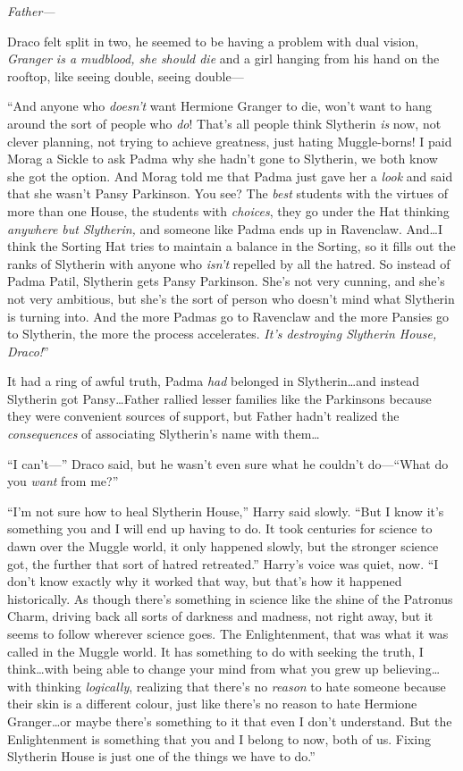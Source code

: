 \emph{Father—}

Draco felt split in two, he seemed to be having a problem with dual vision, \emph{Granger is a mudblood, she should die} and a girl hanging from his hand on the rooftop, like seeing double, seeing double—

“And anyone who \emph{doesn’t} want Hermione Granger to die, won’t want to hang around the sort of people who \emph{do}! That’s all people think Slytherin \emph{is} now, not clever planning, not trying to achieve greatness, just hating Muggle-borns! I paid Morag a Sickle to ask Padma why she hadn’t gone to Slytherin, we both know she got the option. And Morag told me that Padma just gave her a \emph{look} and said that she wasn’t Pansy Parkinson. You see? The \emph{best} students with the virtues of more than one House, the students with \emph{choices}, they go under the Hat thinking \emph{anywhere but Slytherin,} and someone like Padma ends up in Ravenclaw. And…I think the Sorting Hat tries to maintain a balance in the Sorting, so it fills out the ranks of Slytherin with anyone who \emph{isn’t} repelled by all the hatred. So instead of Padma Patil, Slytherin gets Pansy Parkinson. She’s not very cunning, and she’s not very ambitious, but she’s the sort of person who doesn’t mind what Slytherin is turning into. And the more Padmas go to Ravenclaw and the more Pansies go to Slytherin, the more the process accelerates. \emph{It’s destroying Slytherin House, Draco!}”

It had a ring of awful truth, Padma \emph{had} belonged in Slytherin…and instead Slytherin got Pansy…Father rallied lesser families like the Parkinsons because they were convenient sources of support, but Father hadn’t realized the \emph{consequences} of associating Slytherin’s name with them…

“I can’t—” Draco said, but he wasn’t even sure what he couldn’t do—“What do you \emph{want} from me?”

“I’m not sure how to heal Slytherin House,” Harry said slowly. “But I know it’s something you and I will end up having to do. It took centuries for science to dawn over the Muggle world, it only happened slowly, but the stronger science got, the further that sort of hatred retreated.” Harry’s voice was quiet, now. “I don’t know exactly why it worked that way, but that’s how it happened historically. As though there’s something in science like the shine of the Patronus Charm, driving back all sorts of darkness and madness, not right away, but it seems to follow wherever science goes. The Enlightenment, that was what it was called in the Muggle world. It has something to do with seeking the truth, I think…with being able to change your mind from what you grew up believing…with thinking \emph{logically}, realizing that there’s no \emph{reason} to hate someone because their skin is a different colour, just like there’s no reason to hate Hermione Granger…or maybe there’s something to it that even I don’t understand. But the Enlightenment is something that you and I belong to now, both of us. Fixing Slytherin House is just one of the things we have to do.”

